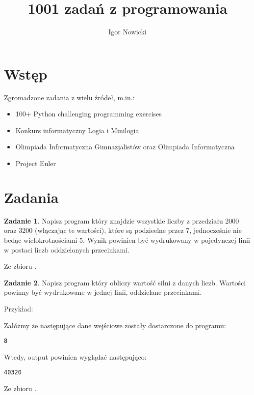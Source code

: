 \documentclass[11pt]{article}
\title{1001 zadań z programowania}
\author{Igor Nowicki}
\theoremstyle{definition}
\newtheorem{zadanie}{Zadanie}
\newcommand{\fromA}{\small Ze zbioru \cite{python100}.}
\begin{document}
\maketitle
\tableofcontents
\section{Wstęp}

Zgromadzone zadania z wielu źródeł, m.in.:

\begin{itemize}
\item 100+ Python challenging programming exercises
\item Konkurs informatyczny Logia i Minilogia
\item Olimpiada Informatyczna Gimnazjalistów oraz Olimpiada Informatyczna
\item Project Euler
\end{itemize}

\section{Zadania}

\begin{zadanie}

Napisz program który znajdzie wszystkie liczby z przedziału 2000 oraz 3200 (włączając te wartości), które są podzieelne przez 7, jednocześnie nie bedąc wielokrotnościami 5. Wynik powinien być wydrukowany w pojedynczej linii w postaci liczb oddzielonych przecinkami.

\fromA
\end{zadanie}

\begin{zadanie}

Napisz program który obliczy wartość silni z danych liczb. Wartości powinny być wydrukowane w jednej linii, oddzielane przecinkami.

Przykład:

Załóżmy że następujące dane wejściowe zostały dostarczone do programu:
\begin{verbatim}
8
\end{verbatim}
Wtedy, output powinien wyglądać następująco:
\begin{verbatim}
40320
\end{verbatim}

\fromA
\end{zadanie}
\end{document}
